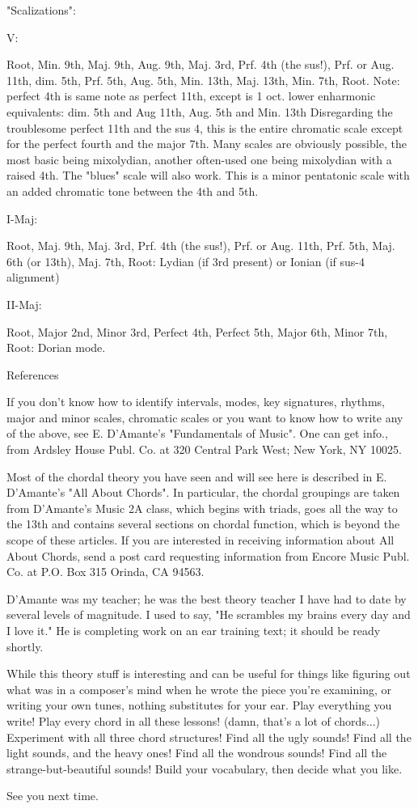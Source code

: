 "Scalizations":

V:

Root, Min. 9th, Maj. 9th, Aug. 9th, Maj. 3rd, Prf. 4th (the sus!), 
Prf. or Aug. 11th, dim. 5th, Prf. 5th, Aug. 5th, Min. 13th, Maj. 13th,
Min. 7th, Root.
Note: perfect 4th is same note as perfect 11th, except is 1 oct. lower
      enharmonic equivalents: dim. 5th and Aug 11th, 
                              Aug. 5th and Min. 13th
Disregarding the troublesome perfect 11th and the sus 4, this is the
entire chromatic scale except for the perfect fourth and the 
major 7th. Many scales are obviously possible, the most basic being 
mixolydian, another often-used one being mixolydian with a raised 4th.
The "blues" scale will also work. This is a minor pentatonic scale with 
an added chromatic tone between the 4th and 5th.

I-Maj:

Root, Maj. 9th, Maj. 3rd, Prf. 4th (the sus!), Prf. or Aug. 11th,
Prf. 5th, Maj. 6th (or 13th), Maj. 7th, Root:
Lydian (if 3rd present) or Ionian (if sus-4 alignment)

II-Maj:

Root, Major 2nd, Minor 3rd, Perfect 4th, Perfect 5th,
Major 6th, Minor 7th, Root:
Dorian mode.

References

If you don't know how to identify intervals, modes, key signatures,
rhythms, major and minor scales, chromatic scales or you want to know
how to write any of the above, see E. D'Amante's "Fundamentals of Music".
One can get info., from Ardsley House Publ. Co. at 320 Central Park West;
New York, NY 10025.

Most of the chordal theory you have seen and will see here is described 
in E. D'Amante's "All About Chords". In particular, the chordal groupings
are taken from D'Amante's Music 2A class, which begins with triads, goes
all the way to the 13th and contains several sections on chordal function,
which is beyond the scope of these articles. If you are interested in
receiving information about All About Chords, send a post card requesting
information from Encore Music Publ. Co. at P.O. Box 315 Orinda, CA 94563.

D'Amante was my teacher; he was the best theory teacher I have had to
date by several levels of magnitude. I used to say, "He scrambles my
brains every day and I love it." He is completing work on an ear training
text; it should be ready shortly.

While this theory stuff is interesting and can be useful for things like
figuring out what was in a composer's mind when he wrote the piece you're
examining, or writing your own tunes, nothing substitutes for your ear.
Play everything you write! Play every chord in all these lessons! (damn,
that's a lot of chords...) Experiment with all three chord structures!
Find all the ugly sounds! Find all the light sounds, and the heavy ones!
Find all the wondrous sounds! Find all the strange-but-beautiful sounds!
Build your vocabulary, then decide what you like.

See you next time.

